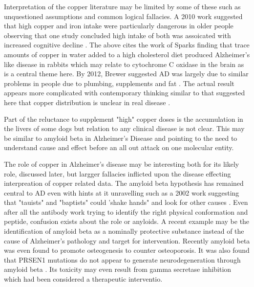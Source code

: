 {%
Interpretation of the copper literature may be  limited by 
some of these such as unquestioned assumptions and common logical fallacies. 
A 2010 work suggested that high copper and iron intake were
particularly dangerous in older people observing that
one study concluded high intake of both was assoicated with increased cognitive
decline 
\cite{Brewer_Risks_Copper_2010}.
The above cites the work of Sparks finding that trace amounts
of copper in water added to a high cholesterol diet produced
Alzheimer's like disease in rabbits
\cite{Sparks_Schreurs_Trace_amounts_copper_2003}
which may relate to cytochrome C oxidase in the brain
\cite{Mohan2009} as is a central theme here. 
By 2012, Brewer suggested AD was largely due to similar
problems in people due to plumbing, supplements and fat
\cite{Brewer_Copper_toxicity_Alzheimer_2012}.
The actual result appears more complicated
\cite{Schreurs_SmithBell_Darwish_Cholesterol_enhances_classical_conditioning_2007}
\cite{PMC3773440}
with contemporary thinking similar to that suggested
here that copper distribution is unclear in real disease
\cite{Ejaz_Wang_Lang_Copper_Toxicity_Links_2020}.

Part of the reluctance to supplement "high" copper doses
is the accumulation in the livers of some dogs but
relation to any clinical disease is not clear. This
may be similar to amyloid beta in Alzheimer's
Disease and pointing to the need to understand cause
and effect before an all out attack on one molecular
entity.  

The role of copper in Alzheimer's disease may be interesting
both for its likely role, discussed later, but largger fallacies
inflicted upon the disease effecting interpreation of copper related data.
The amyloid beta hypothesis has remained central to AD 
even with  hints at it unravelling\cite{PMID37833948}  such as a 2002 work
suggesting that  "tauists" and "baptists" could 'shake hands"
and look for other causes \cite{PMID11801334}.
Even after all the antibody work trying to identify
the right physical conformation and peptide,
confusion exists about the role or anyloids. 
A recent example may be the identification of amyloid
beta as a nominally protective substance
\cite{Yu_Wu_Amyloid_upbeta_double_2021}
\cite{PMID35673950}
 instead of
the cause of Alzheimer's pathology and target
for intervention. 
Recently amyloid beta was even found to promote osteogenesis
\cite{PMC11301219} to counter osteoporosis.
It was also found that PRSEN1 mutations do not appear
to generate neurodegeneration through amyloid beta 
\cite{PMID39136994}.
Its toxicity may even result from gamma secretase inhibition
\cite{PMC11259434} which had been considered a therapeutic interventio.

}
